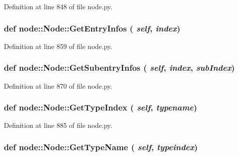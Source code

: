 Definition at line 848 of file node.py.\hypertarget{classnode_1_1Node_ca8f7294684dc241193f0a7482ca240b}{
\subsubsection[GetEntryInfos]{\setlength{\rightskip}{0pt plus 5cm}def node::Node::Get\-Entry\-Infos ( {\em self},  {\em index})}}
\label{classnode_1_1Node_ca8f7294684dc241193f0a7482ca240b}




Definition at line 859 of file node.py.\hypertarget{classnode_1_1Node_af7e760ac825aa5611d2c08cbf572261}{
\subsubsection[GetSubentryInfos]{\setlength{\rightskip}{0pt plus 5cm}def node::Node::Get\-Subentry\-Infos ( {\em self},  {\em index},  {\em sub\-Index})}}
\label{classnode_1_1Node_af7e760ac825aa5611d2c08cbf572261}




Definition at line 870 of file node.py.\hypertarget{classnode_1_1Node_745867283d1ca5d81e67e7d0704cf0c1}{
\subsubsection[GetTypeIndex]{\setlength{\rightskip}{0pt plus 5cm}def node::Node::Get\-Type\-Index ( {\em self},  {\em typename})}}
\label{classnode_1_1Node_745867283d1ca5d81e67e7d0704cf0c1}




Definition at line 885 of file node.py.\hypertarget{classnode_1_1Node_d44071dce04af279a723354b20b02602}{
\subsubsection[GetTypeName]{\setlength{\rightskip}{0pt plus 5cm}def node::Node::Get\-Type\-Name ( {\em self},  {\em typeindex})}}
\label{classnode_1_1Node_d44071dce04af279a723354b20b02602}




